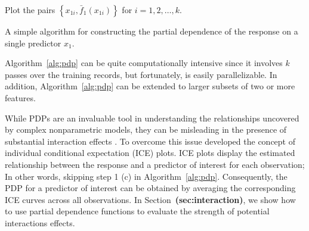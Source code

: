 \documentclass[12pt]{article}
\def\ref#1{\textbf{(#1)}}
\begin{document}
\begin{algorithm}
    \BlankLine
    Plot the pairs $\left\{x_{1i}, \bar{f}_1\left(x_{1i}\right)\right\}$ for $i = 1, 2, \dotsc, k$.
    \BlankLine
  \caption{A simple algorithm for constructing the partial dependence of the response on a single predictor $x_1$. \label{alg:pdp}}
\end{algorithm}
Algorithm~\eqref{alg:pdp} can be quite computationally intensive since it involves $k$ passes over the training records, but fortunately, is easily parallelizable. In addition, Algorithm~\eqref{alg:pdp} can be extended to larger subsets of two or more features.

While PDPs are an invaluable tool in understanding the relationships uncovered by complex nonparametric models, they can be misleading in the presence of substantial interaction effects \citep{goldstein-peeking-2015}. To overcome this issue \citeauthor{goldstein-peeking-2015} developed the concept of individual conditional expectation (ICE) plots. ICE plots display the estimated relationship between the response and a predictor of interest for each observation; In other words, skipping step 1 (c) in Algorithm~\eqref{alg:pdp}. Consequently, the PDP for a predictor of interest can be obtained by averaging the corresponding ICE curves across all observations. In Section~\ref{sec:interaction}, we show how to use partial dependence functions to evaluate the strength of potential interactions effects.
\end{document}
